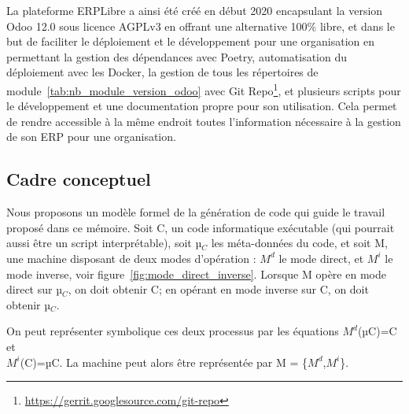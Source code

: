 La plateforme ERPLibre a ainsi été créé en début 2020 encapsulant la version Odoo 12.0 sous licence AGPLv3 en offrant une alternative 100\% libre, et dans le but de faciliter le déploiement et le développement pour une organisation en permettant la gestion des dépendances avec Poetry, automatisation du déploiement avec les Docker, la gestion de tous les répertoires de module~\ref{tab:nb_module_version_odoo} avec Git Repo\footnote{\url{https://gerrit.googlesource.com/git-repo}}, et plusieurs scripts pour le développement et une documentation propre pour son utilisation. Cela permet de rendre accessible à la même endroit toutes l'information nécessaire à la gestion de son ERP pour une organisation.





\subsection{Cadre conceptuel}

Nous proposons un modèle formel de la génération de code qui guide le travail proposé dans ce mémoire. Soit C, un code informatique exécutable (qui pourrait aussi être un script interprétable), soit µ$_C$ les méta-données du code, et soit M, une machine disposant de deux modes d’opération : $M^d$ le mode direct, et $M^i$ le mode inverse, voir figure~\ref{fig:mode_direct_inverse}. Lorsque M opère en mode direct sur µ$_C$, on doit obtenir C; en opérant en mode inverse sur C, on doit obtenir µ$_C$.

On peut représenter symbolique ces deux processus par les équations
$M^d$(µC)=C et \\ $M^i$(C)=µC. La machine peut alors être représentée par M = \{$M^d$,$M^i$\}.

